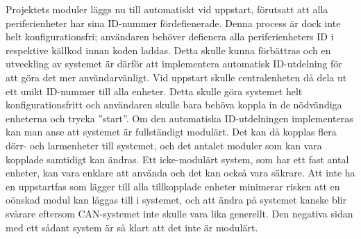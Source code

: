 Projektets moduler läggs nu till automatiskt vid uppstart, förutsatt att alla periferienheter har sina ID-nummer fördefienerade. Denna process är dock inte helt konfigurationsfri; användaren behöver defienera alla periferienheters ID i respektive källkod innan koden laddas. Detta skulle kunna förbättras och en utveckling av systemet är därför att implementera automatisk ID-utdelning för att göra det mer användarvänligt. Vid uppstart skulle centralenheten då dela ut ett unikt ID-nummer till alla enheter. Detta skulle göra systemet helt konfigurationsfritt och användaren skulle bara behöva koppla in de nödvändiga enheterna och trycka ''start''. 
\newline \newline 
Om den automatiska ID-utdelningen implementeras kan man anse att systemet är fullständigt modulärt. Det kan då kopplas flera dörr- och larmenheter till systemet, och det antalet moduler som kan vara kopplade samtidigt kan ändras. 
Ett icke-modulärt system, som har ett fast antal enheter, kan vara enklare att använda och det kan också vara säkrare. Att inte ha en uppstartfas som lägger till alla tillkopplade enheter minimerar risken att en oönskad modul kan läggas till i systemet, och att ändra på systemet kanske  blir svårare eftersom CAN-systemet inte skulle vara lika generellt. Den negativa sidan med ett sådant system är så klart att det inte är modulärt.


